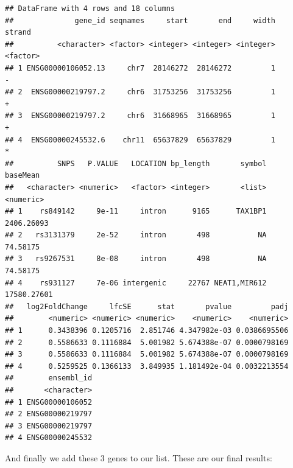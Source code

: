 \documentclass[9pt,a4paper,]{extarticle}
\newenvironment{Shaded}{\begin{snugshade}}{\end{snugshade}}
\newcommand{\KeywordTok}[1]{\textcolor[rgb]{0.13,0.29,0.53}{\textbf{#1}}}
\newcommand{\DataTypeTok}[1]{\textcolor[rgb]{0.13,0.29,0.53}{#1}}
\newcommand{\StringTok}[1]{\textcolor[rgb]{0.31,0.60,0.02}{#1}}
\newcommand{\OperatorTok}[1]{\textcolor[rgb]{0.81,0.36,0.00}{\textbf{#1}}}
\newcommand{\NormalTok}[1]{#1}
\begin{document}
\begin{verbatim}
## DataFrame with 4 rows and 18 columns
##              gene_id seqnames     start       end     width   strand
##          <character> <factor> <integer> <integer> <integer> <factor>
## 1 ENSG00000106052.13     chr7  28146272  28146272         1        -
## 2  ENSG00000219797.2     chr6  31753256  31753256         1        +
## 3  ENSG00000219797.2     chr6  31668965  31668965         1        +
## 4  ENSG00000245532.6    chr11  65637829  65637829         1        *
##          SNPS   P.VALUE   LOCATION bp_length       symbol    baseMean
##   <character> <numeric>   <factor> <integer>       <list>   <numeric>
## 1    rs849142     9e-11     intron      9165      TAX1BP1  2406.26093
## 2   rs3131379     2e-52     intron       498           NA    74.58175
## 3   rs9267531     8e-08     intron       498           NA    74.58175
## 4    rs931127     7e-06 intergenic     22767 NEAT1,MIR612 17580.27601
##   log2FoldChange     lfcSE      stat       pvalue         padj
##        <numeric> <numeric> <numeric>    <numeric>    <numeric>
## 1      0.3438396 0.1205716  2.851746 4.347982e-03 0.0386695506
## 2      0.5586633 0.1116884  5.001982 5.674388e-07 0.0000798169
## 3      0.5586633 0.1116884  5.001982 5.674388e-07 0.0000798169
## 4      0.5259525 0.1366133  3.849935 1.181492e-04 0.0032213554
##        ensembl_id
##       <character>
## 1 ENSG00000106052
## 2 ENSG00000219797
## 3 ENSG00000219797
## 4 ENSG00000245532
\end{verbatim}

And finally we add these 3 genes to our list.
These are our final results:

\begin{Shaded}
\end{Shaded}
\end{document}
